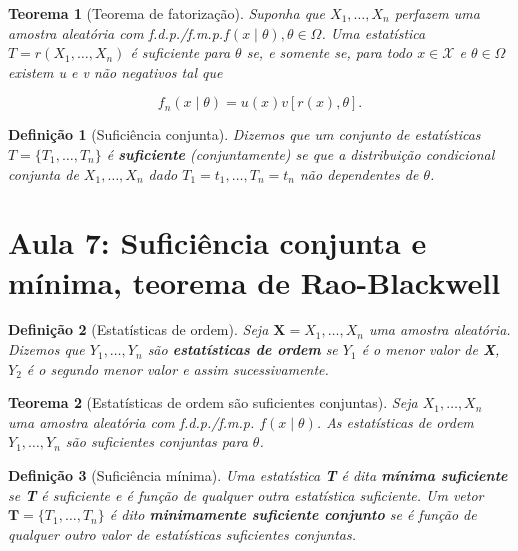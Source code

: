 \documentclass{article}
\newtheorem{theorem}{Teorema}
\newtheorem{definition}{Definição}
\begin{document}
\begin{theorem}[Teorema de fatorização]\label{teo:fatorizacao}
Suponha que $X_1, \ldots, X_n$ perfazem uma amostra aleatória com f.d.p./f.m.p.$f(x \mid \theta), \theta \in \Omega$. Uma estatística $T = r(X_1, \ldots, X_n)$ é suficiente para $\theta$ se, e somente se, para todo $x \in \mathcal{X}$ e $\theta \in \Omega$ existem u e v não negativos tal que

\begin{equation}
    f_n(x \mid \theta) = u(x) v[r(x), \theta].
\end{equation}
\end{theorem}

\begin{definition}[Suficiência conjunta]
Dizemos que um conjunto de estatísticas $T = \{T_1, \ldots, T_n\}$ é \textbf{suficiente} (conjuntamente) se que a distribuição condicional conjunta de $X_1, \ldots, X_n$ dado $T_1 = t_1, \ldots, T_n = t_n$ não dependentes de $\theta$.
\end{definition}

\section*{Aula 7: Suficiência conjunta e mínima, teorema de Rao-Blackwell}

\begin{definition}[Estatísticas de ordem]
Seja $\textbf{X} = X_1, \ldots, X_n$ uma amostra aleatória. Dizemos que $Y_1, \ldots, Y_n$ são \textbf{estatísticas de ordem} se $Y_1$ é o menor valor de \textbf{X}, $Y_2$ é o segundo menor valor e assim sucessivamente.
\end{definition}

\begin{theorem}[Estatísticas de ordem são suficientes conjuntas]
Seja $X_1, \ldots, X_n$ uma amostra aleatória com f.d.p./f.m.p. $f(x \mid \theta)$. As estatísticas de ordem $Y_1, \ldots, Y_n$ são suficientes conjuntas para $\theta$.
\end{theorem}

\begin{definition}[Suficiência mínima]
Uma estatística \textbf{T} é dita \textbf{mínima suficiente} se \textbf{T} é suficiente e é função de qualquer outra estatística suficiente. Um vetor $\textbf{T} = \{ T_1, \ldots, T_n \}$ é dito \textbf{minimamente suficiente conjunto} se é função de qualquer outro valor de estatísticas suficientes conjuntas.
\end{definition}
\end{document}
